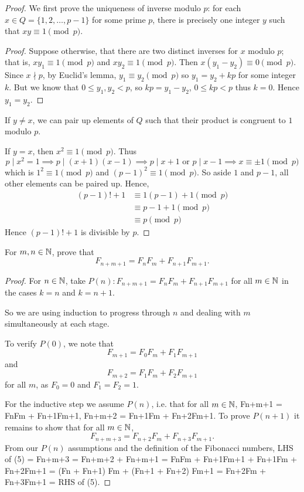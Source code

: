 \begin{proof}
We first prove the uniqueness of inverse modulo $p$: for each $x\in Q=\{1,2,\dots,p-1\}$ for some prime $p$, there is precisely one integer $y$ such that $xy\equiv 1\pmod p$.
\begin{proof}
Suppose otherwise, that there are two distinct inverses for $x$ modulo $p$; that is, $xy_1\equiv 1\pmod p$ and $xy_2\equiv 1\pmod p$. Then $x(y_1-y_2)\equiv 0\pmod p$. Since $x\nmid p$, by Euclid's lemma, $y_1\equiv y_2\pmod p$ so $y_1=y_2+kp$ for some integer $k$. But we know that $0\le y_1,y_2<p$, so $kp=y_1-y_2$, $0\le kp<p$ thus $k=0$. Hence $y_1=y_2$.
\end{proof}

If $y\neq x$, we can pair up elements of $Q$ such that their product is congruent to $1$ modulo $p$.

If $y=x$, then $x^2\equiv 1\pmod p$. Thus
\[ p\mid x^2=1 \implies p\mid(x+1)(x-1) \implies p\mid x+1\text{ or }p\mid x-1 \implies x\equiv\pm1\pmod p \]
which is $1^2\equiv1\pmod p$ and $(p-1)^2\equiv1\pmod p$. So aside $1$ and $p-1$, all other elements can be paired up. Hence,
\begin{align*}
(p-1)!+1&\equiv1(p-1)+1\pmod p\\
&\equiv p-1+1\pmod p\\
&\equiv p\pmod p
\end{align*}
Hence $(p-1)!+1$ is divisible by $p$.
\end{proof}
\pagebreak

\begin{prbm}
For $m,n\in\mathbb N$, prove that
\[ F_{n+m+1}=F_nF_m+F_{n+1}F_{m+1}. \]
\end{prbm}

\begin{proof}
For $n\in\mathbb N$, take $P(n):F_{n+m+1}=F_nF_m+F_{n+1}F_{m+1}$ for all $m\in\mathbb N$ in the cases $k=n$ and $k=n+1$.

So we are using induction to progress through $n$ and dealing with $m$ simultaneously at each stage. 

To verify $P(0)$, we note that
\[ F_{m+1}=F_0F_m+F_1F_{m+1} \]
and
\[ F_{m+2}=F_1F_m+F_2F_{m+1} \]
for all $m$, as $F_0=0$ and $F_1=F_2=1$.

For the inductive step we assume $P(n)$, i.e. that for all $m\in\mathbb N$,
Fn+m+1 = FnFm + Fn+1Fm+1,
Fn+m+2 = Fn+1Fm + Fn+2Fm+1.
To prove $P(n+1)$ it remains to show that for all $m\in\mathbb N$,
\[ F_{n+m+3}=F_{n+2}F_m+F_{n+3}F_{m+1}. \]
From our $P(n)$ assumptions and the definition of the Fibonacci numbers,
LHS of (5) = Fn+m+3
= Fn+m+2 + Fn+m+1
= FnFm + Fn+1Fm+1 + Fn+1Fm + Fn+2Fm+1
= (Fn + Fn+1) Fm + (Fn+1 + Fn+2) Fm+1
= Fn+2Fm + Fn+3Fm+1
= RHS of (5).
\end{proof}

